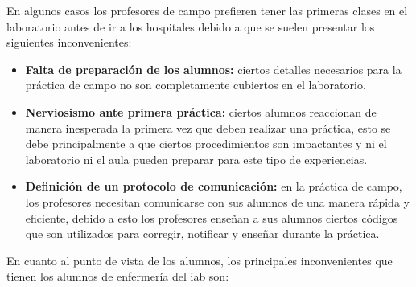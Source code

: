 En algunos casos los profesores de campo prefieren tener las primeras clases en 
el laboratorio antes de ir a los hospitales debido a que se suelen presentar 
los siguientes inconvenientes:

\begin{itemize}
    \item \textbf{Falta de preparación de los alumnos:} ciertos detalles necesarios para
        la práctica de campo no son completamente cubiertos en el
        laboratorio.

    \item \textbf{Nerviosismo ante primera práctica:} ciertos alumnos reaccionan de
        manera inesperada la primera vez que deben realizar una práctica, esto
        se debe principalmente a que ciertos procedimientos son impactantes y
        ni el laboratorio ni el aula pueden preparar para este tipo de
        experiencias.
                
    \item \textbf{Definición de un protocolo de comunicación:} en la práctica de campo,
        los profesores necesitan comunicarse con sus alumnos de una manera
        rápida y eficiente, debido a esto los profesores enseñan a sus alumnos
        ciertos códigos que son utilizados para corregir, notificar y enseñar
        durante la práctica.
          
\end{itemize}


En cuanto al punto de vista de los alumnos, los principales inconvenientes que
tienen los alumnos de enfermería del \Gls{iab} son:

